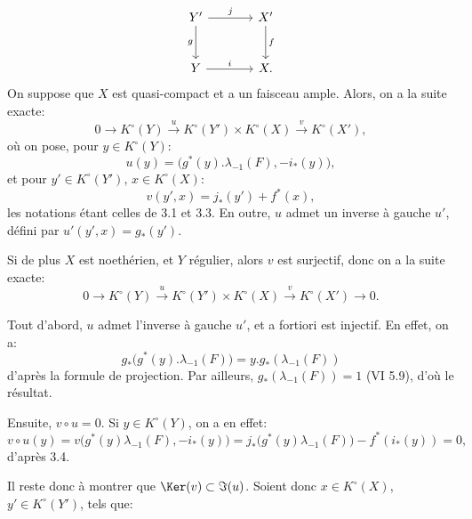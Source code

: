\[
\begin{tikzcd}[column sep=large,row sep=large]
Y' \arrow[r,"j"] \arrow[d,"g"'] & X' \arrow[d,"f"]\\
Y \arrow[r,"i"] & X.
\end{tikzcd}
\]
On
suppose que \(X\) est quasi-compact et a un faisceau ample. Alors, on a la suite exacte:
\[
0\longrightarrow K^\circ(Y)\xrightarrow{u}K^\circ(Y')\times K^\circ(X)
\xrightarrow{v}K^\circ(X'),
\]
où on pose, pour \(y\in K^\circ(Y)\):
\[
u(y)=\bigl(g^*(y).\lambda_{-1}(F),-i_*(y)\bigr),
\]
et pour \(y'\in K^\circ(Y')\), \(x\in K^\circ(X)\):
\[
v(y',x)=j_*(y')+f^*(x),
\]
les notations étant celles de 3.1 et 3.3. En outre, \(u\) admet un inverse à gauche \(u'\), défini par \(u'(y',x)=g_*(y')\).

Si de plus \(X\) est noethérien, et \(Y\) régulier, alors \(v\) est surjectif, donc on a la suite exacte:
\[
0\longrightarrow K^\circ(Y)\xrightarrow{u}K^\circ(Y')\times K^\circ(X)
\xrightarrow{v}K^\circ(X')\longrightarrow0.
\]

Tout d'abord, \(u\) admet l'inverse à gauche \(u'\), et a fortiori est injectif. En effet, on a:
\[
g_*\bigl(g^*(y).\lambda_{-1}(F)\bigr)
=y.g_*(\lambda_{-1}(F))
\]
d'après la formule de projection. Par ailleurs, \(g_*(\lambda_{-1}(F))=1\) (VI 5.9), d'où le résultat.

Ensuite, \(v\circ u=0\). Si \(y\in K^\circ(Y)\), on a en effet:
\[
v\circ u(y)
=v\bigl(g^*(y)\lambda_{-1}(F),-i_*(y)\bigr)
=j_*\bigl(g^*(y)\lambda_{-1}(F)\bigr)-f^*(i_*(y))=0,
\]
d'après 3.4.

Il reste donc à montrer que \(\Ker(v)\subset \Im(u)\). Soient donc \(x\in K^\circ(X)\), \(y'\in K^\circ(Y')\), tels que:
